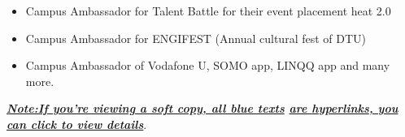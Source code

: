 

\divider

\begin{itemize}

\item Campus Ambassador for Talent Battle for their event placement heat 2.0
\item Campus Ambassador for ENGIFEST (Annual cultural fest of DTU)
\item Campus Ambassador of Vodafone U, SOMO app, LINQQ app and many more.
\end{itemize}
    
    
\divider

\textbf{\textit
{\underline{Note:If you’re viewing a soft copy, all \color{blue} blue texts}
\underline{are \colorbox{VividPurple}{ \color {white} {hyperlinks}}, you can click to view details}}}.
